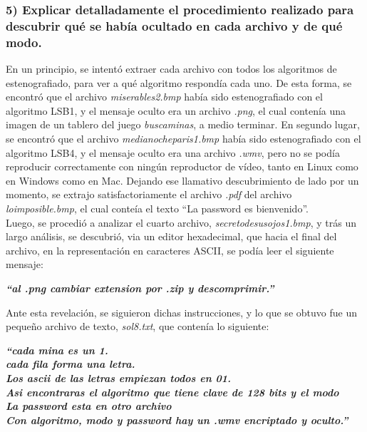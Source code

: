\documentclass[a4paper,10pt]{article}
\begin{document}
\subsubsection*{ 5) Explicar detalladamente el procedimiento realizado para descubrir qué se había ocultado en
cada archivo y de qué modo.}

En un principio, se intentó extraer cada archivo con todos los algoritmos de estenografiado, para ver a qué algoritmo respondía cada uno. De esta forma, se 
encontró que el archivo \textit{miserables2.bmp} había sido estenografiado con el algoritmo LSB1, y el mensaje oculto era un archivo \textit{.png}, el cual contenía una 
imagen de un tablero del juego \textit{buscaminas}, a medio terminar. En segundo lugar, se encontró que el archivo \textit{medianocheparis1.bmp} había sido estenografiado 
con el algoritmo LSB4, y el mensaje oculto era una archivo \textit{.wmv}, pero no se podía reproducir correctamente con ningún reproductor de vídeo, 
tanto en Linux como en Windows como en Mac.
Dejando ese llamativo descubrimiento de lado por un momento, se extrajo satisfactoriamente el archivo \textit{.pdf} del archivo \textit{loimposible.bmp}, el cual conteía el texto
``La password es bienvenido''.\\
Luego, se procedió a analizar el cuarto archivo, \textit{secretodesusojos1.bmp}, y trás un largo análisis, se descubrió, via un editor hexadecimal, que hacia el final del archivo, 
en la representación en caracteres ASCII, se podía leer el siguiente mensaje: \\

\begin{center}
\textbf{\textit{    ``al .png cambiar extension por .zip y descomprimir.''}}
\end{center}

Ante esta revelación, se siguieron dichas instrucciones, y lo que se obtuvo fue un pequeño archivo de texto, \textit{sol8.txt}, que contenía lo siguiente:

\begin{center}
\textbf{\textit{
    ``cada mina es un 1.\\
    cada fila forma una letra.\\
    Los ascii de las letras empiezan todos en 01.\\
    Asi encontraras el algoritmo que tiene clave de 128 bits y el modo\\
    La password esta en otro archivo\\
    Con algoritmo, modo y password hay un .wmv encriptado y oculto.''
}}
\end{center}
\end{document}
